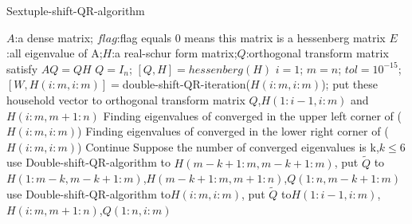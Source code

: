 \renewcommand{\algorithmicrequire}{\textbf{Input:}}
\renewcommand{\algorithmicensure}{\textbf{Output:}}
\begin{breakablealgorithm}
  \caption{Sextuple-shift-QR-algorithm}
  \label{alg::Sextuple-shift-QR-algorithm}
  \begin{algorithmic}[1]
  \Require $A$:a dense matrix; $flag$:flag equals 0 means this matrix is a hessenberg matrix
  \Ensure $E$:all eigenvalue of A;$H$:a real-schur form matrix;$Q$:orthogonal transform matrix satisfy \(AQ=QH\)
  \State\(Q={I_n}\);
    \State\([Q,H]=hessenberg(H)\)
  \EndIf
  \State\(i=1\);
  \State\(m=n\);
  \State\(tol={10^{-15}}\);
  \State\([W,H(i:m,i:m)]=\)double-shift-QR-iteration(\(H(i:m,i:m)\));
  \State put these household vector to orthogonal transform matrix $Q$,\(H(1:i-1,i:m)\) and \(H(i:m,m+1:n)\)
  \State Finding eigenvalues of converged in the upper left corner of (\(H(i:m,i:m)\))
  \State Finding eigenvalues of converged in the lower right corner of (\(H(i:m,i:m)\))
    \State Continue
  \EndIf
  \State Suppose the number of converged eigenvalues is k,\(k\le6\)
  \State use Double-shift-QR-algorithm to \(H(m-k+1:m,m-k+1:m)\), put \(\widetilde Q\) to \(H(1:m-k,m-k+1:m)\),\(H(m-k+1:m,m+1:n)\),\(Q(1:n,m-k+1:m)\)
  \EndWhile
    \State use Double-shift-QR-algorithm to\(H(i:m,i:m)\), put \(\widetilde Q\) to\(H(1:i-1,i:m)\),\(H(i:m,m+1:n)\),\(Q(1:n,i:m)\)
  \EndIf
  \end{algorithmic}
\end{breakablealgorithm}
